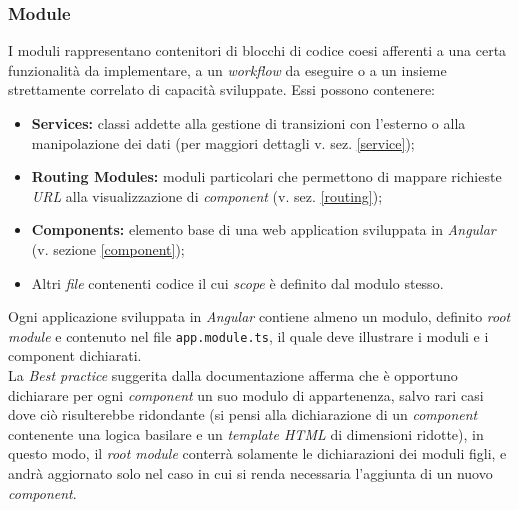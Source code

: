 \subsubsection{Module}
I moduli rappresentano contenitori di blocchi di codice coesi afferenti a una certa funzionalità da implementare, a un \textit{workflow} da eseguire o a un insieme strettamente correlato di capacità sviluppate.
Essi possono contenere:
\begin{itemize}
	\item \textbf{Services:} classi addette alla gestione di transizioni con l'esterno o alla manipolazione dei dati (per maggiori dettagli  v. sez. \ref{service});
	\item \textbf{Routing Modules:} moduli particolari che permettono di mappare richieste \textit{URL} alla visualizzazione di \textit{component} (v. sez. \ref{routing});
	\item \textbf{Components:} elemento base di una web application sviluppata in \textit{Angular} (v. sezione \ref{component});
	\item Altri \textit{file} contenenti codice il cui \textit{scope} è definito dal modulo stesso.
\end{itemize}
Ogni applicazione sviluppata in \textit{Angular} contiene almeno un modulo, definito \textit{root module} e contenuto nel file \texttt{app.module.ts}, il quale deve illustrare i moduli e i component dichiarati.\\
La \textit{Best practice} suggerita dalla documentazione afferma che è opportuno dichiarare per ogni \textit{component} un suo modulo di appartenenza, salvo rari casi dove ciò risulterebbe ridondante (si pensi alla dichiarazione di un \textit{component} contenente una logica basilare e un \textit{template HTML} di dimensioni ridotte), in questo modo, il \textit{root module} conterrà solamente le dichiarazioni dei moduli figli, e andrà aggiornato solo nel caso in cui si renda necessaria l'aggiunta di un nuovo \textit{component}.

